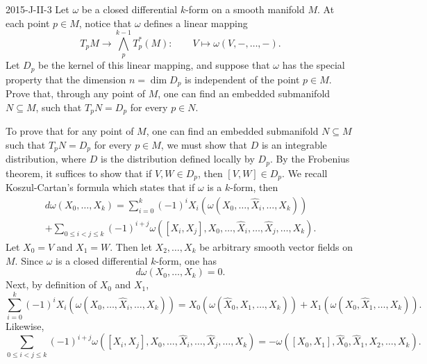 \documentclass{article}
\begin{document}
	
	\begin{prb}{2015-J-II-3}
		Let $\omega$ be a closed differential $k$-form on a smooth manifold $M$. At each point $p\in M$, notice that $\omega$ defines a linear mapping 
		\begin{equation*}
			T_{p}M \to \bigwedge_{p}^{k -1}T_{p}^{\ast}(M): \qquad  V \mapsto \omega(V, -, \ldots, -). 
		\end{equation*}
		Let $D_{p}$ be the kernel of this linear mapping, and suppose that $\omega$ has the special property that the dimension $n= \dim{D_{p}}$ is independent of the point $p \in M$. Prove that, through any point of $M$, one can find an embedded submanifold $N \subseteq M$, such that $T_{p}N = D_{p}$ for every $p \in N$. 
	\end{prb}
	To prove that for any point of $M$, one can find an embedded submanifold $N \subseteq M$ such that $T_{p}N = D_{p}$ for every $p \in M$, we must show that $D$ is an integrable distribution, where $D$ is the distribution defined locally by $D_{p}$. By the Frobenius theorem, it suffices to show that if $V, W \in D_{p}$, then $[V, W] \in D_{p}$. We recall Koszul-Cartan's formula which states that if $\omega$ is a $k$-form, then 
	\begin{multline*}
		d\omega(X_{0}, \ldots, X_{k}) = \sum_{i = 0}^{k}(-1)^{i}X_{i}(\omega(X_{0}, \ldots, \hat{X}_{i}, \ldots, X_{k})) \\ + \sum_{0 \leq i < j \leq k}(-1)^{i + j}\omega([X_{i},X_{j}], X_{0}, \ldots, \hat{X}_{i}, \ldots, \hat{X}_{j}, \ldots, X_{k}).
	\end{multline*}
	Let $X_{0} = V$ and $X_{1} = W$. Then let $X_{2}, \ldots, X_{k}$ be arbitrary smooth vector fields on $M$. Since $\omega$ is a closed differential $k$-form, one has 
	\begin{equation*}
		d\omega(X_{0}, \ldots, X_{k}) = 0. 
	\end{equation*}
	Next, by definition of $X_{0}$ and $X_{1}$,
	\begin{equation*}
		\sum_{i= 0}^{k}(-1)^{i}X_{i}(\omega(X_{0}, \ldots, \hat{X}_{i}, \ldots, X_{k})) = X_{0}(\omega(\hat{X}_{0}, X_{1}, \ldots,X_{k})) + X_{1}(\omega(X_{0}, \hat{X}_{1}, \ldots, X_{k})). 
	\end{equation*}
	Likewise, 
	\begin{equation*}
		\sum_{0 \leq i < j \leq k}(-1)^{i + j}\omega([X_{i}, X_{j}], X_{0}, \ldots, \hat{X}_{i}, \ldots, \hat{X}_{j}, \ldots, X_{k}) = -\omega([X_{0}, X_{1}], \hat{X}_{0}, \hat{X}_{1}, X_{2}, \ldots, X_{k}). 
	\end{equation*}
\end{document}

